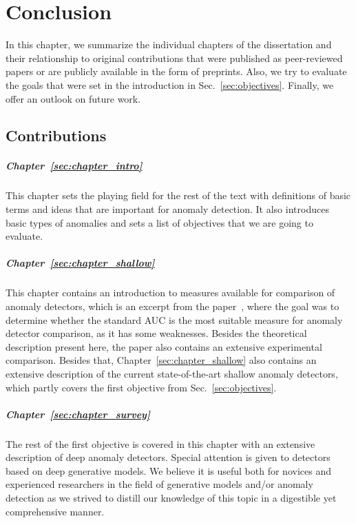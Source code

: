 \chapter{Conclusion} \label{sec:conclusion}
In this chapter, we summarize the individual chapters of the dissertation and their relationship to original contributions that were published as peer-reviewed papers or are publicly available in the form of preprints. Also, we try to evaluate the goals that were set in the introduction in Sec.~\ref{sec:objectives}. Finally, we offer an outlook on future work.

\section{Contributions}
\paragraph{Chapter~\ref{sec:chapter_intro}} This chapter sets the playing field for the rest of the text with definitions of basic terms and ideas that are important for anomaly detection. It also introduces basic types of anomalies and sets a list of objectives that we are going to evaluate.

\paragraph{Chapter~\ref{sec:chapter_shallow}} This chapter contains an introduction to measures available for comparison of anomaly detectors, which is an excerpt from the paper~\cite{vskvara2023auc}, where the goal was to determine whether the standard AUC is the most suitable measure for anomaly detector comparison, as it has some weaknesses. Besides the theoretical description present here, the paper also contains an extensive experimental comparison. Besides that, Chapter~\ref{sec:chapter_shallow} also contains an extensive description of the current state-of-the-art shallow anomaly detectors, which partly covers the first objective from Sec.~\ref{sec:objectives}.

\paragraph{Chapter~\ref{sec:chapter_survey}} The rest of the first objective is covered in this chapter with an extensive description of deep anomaly detectors. Special attention is given to detectors based on deep generative models. We believe it is useful both for novices and experienced researchers in the field of generative models and/or anomaly detection as we strived to distill our knowledge of this topic in a digestible yet comprehensive manner.

